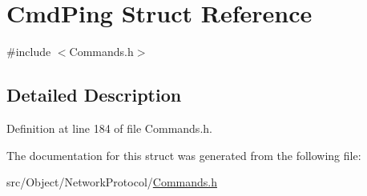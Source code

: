 \hypertarget{struct_cmd_ping}{
\section{CmdPing Struct Reference}
\label{struct_cmd_ping}
}


{\ttfamily \#include $<$Commands.h$>$}



\subsection{Detailed Description}


Definition at line 184 of file Commands.h.



The documentation for this struct was generated from the following file:\begin{DoxyCompactItemize}
\item 
src/Object/NetworkProtocol/\hyperlink{_commands_8h}{Commands.h}\end{DoxyCompactItemize}
